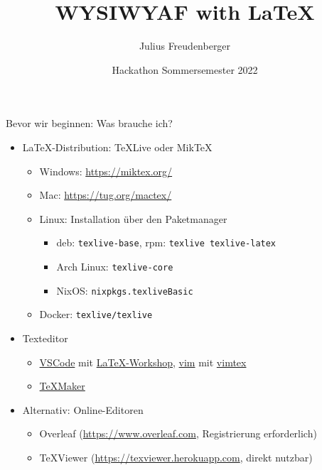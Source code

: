 \documentclass[presentation,aspectratio=169]{beamer}
\author{Julius Freudenberger}
\date{Hackathon Sommersemester 2022}
\title{WYSIWYAF with \LaTeX}
\institute[Hochschule Esslingen]{Hochschule Esslingen}
\begin{document}
\maketitle

\begin{frame}[fragile]{Bevor wir beginnen: Was brauche ich?}
  \begin{itemize}
    \item \LaTeX-Distribution: \TeX{}Live oder Mik\TeX{}
      \begin{itemize}
        \item Windows: \href{https://miktex.org/}{https://miktex.org/}
        \item Mac: \href{https://tug.org/mactex/}{https://tug.org/mactex/}
        \item Linux: Installation über den Paketmanager
          \begin{itemize}
            \item deb: \verb|texlive-base|, rpm: \verb|texlive texlive-latex|
            \item Arch Linux: \verb|texlive-core|
            \item NixOS: \verb|nixpkgs.texliveBasic|
          \end{itemize}
        \item Docker: \verb|texlive/texlive|
      \end{itemize}
    \item Texteditor
      \begin{itemize}
        \item \href{https://code.visualstudio.com/}{VSCode} mit \href{https://marketplace.visualstudio.com/items?itemName=James-Yu.latex-workshop}{\LaTeX-Workshop}, \href{https://www.vim.org/}{vim} mit \href{https://github.com/lervag/vimtex}{vimtex}
        \item \href{https://www.xm1math.net/texmaker/index.html}{\TeX{}Maker}
      \end{itemize}
    \item Alternativ: Online-Editoren
      \begin{itemize}
        \item Overleaf (\href{https://www.overleaf.com}{https://www.overleaf.com}, Registrierung erforderlich)
        \item \TeX{}Viewer (\href{https://texviewer.herokuapp.com}{https://texviewer.herokuapp.com}, direkt nutzbar)
      \end{itemize}
  \end{itemize}
\end{frame}
\end{document}
